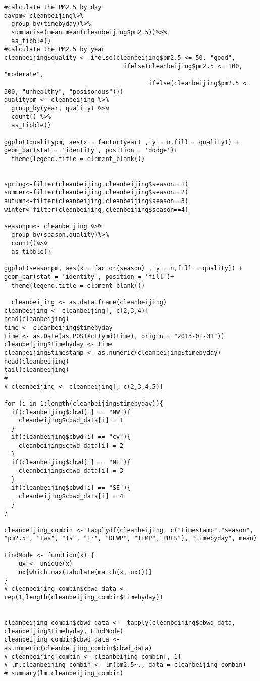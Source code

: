 \begin{verbatim}
#calculate the PM2.5 by day
daypm<-cleanbeijing%>%
  group_by(timebyday)%>%
  summarise(mean=mean(cleanbeijing$pm2.5))%>%
  as_tibble()
#calculate the PM2.5 by year
cleanbeijing$quality <- ifelse(cleanbeijing$pm2.5 <= 50, "good",
                                 ifelse(cleanbeijing$pm2.5 <= 100, "moderate",
                                        ifelse(cleanbeijing$pm2.5 <= 300, "unhealthy", "posisonous")))
qualitypm <- cleanbeijing %>%
  group_by(year, quality) %>%
  count() %>%
  as_tibble()

ggplot(qualitypm, aes(x = factor(year) , y = n,fill = quality)) + geom_bar(stat = 'identity', position = 'dodge')+
  theme(legend.title = element_blank())


spring<-filter(cleanbeijing,cleanbeijing$season==1)
summer<-filter(cleanbeijing,cleanbeijing$season==2)
autumn<-filter(cleanbeijing,cleanbeijing$season==3)
winter<-filter(cleanbeijing,cleanbeijing$season==4)

seasonpm<- cleanbeijing %>%
  group_by(season,quality)%>%
  count()%>%
  as_tibble()

ggplot(seasonpm, aes(x = factor(season) , y = n,fill = quality)) + geom_bar(stat = 'identity', position = 'fill')+
  theme(legend.title = element_blank())

  cleanbeijing <- as.data.frame(cleanbeijing)
cleanbeijing <- cleanbeijing[,-c(2,3,4)]
head(cleanbeijing)
time <- cleanbeijing$timebyday
time <- as.Date(as.POSIXct(ymd(time), origin = "2013-01-01"))
cleanbeijing$timebyday <- time
cleanbeijing$timestamp <- as.numeric(cleanbeijing$timebyday)
head(cleanbeijing)
tail(cleanbeijing)
#
# cleanbeijing <- cleanbeijing[,-c(2,3,4,5)]

for (i in 1:length(cleanbeijing$timebyday)){
  if(cleanbeijing$cbwd[i] == "NW"){
    cleanbeijing$cbwd_data[i] = 1
  }
  if(cleanbeijing$cbwd[i] == "cv"){
    cleanbeijing$cbwd_data[i] = 2
  }
  if(cleanbeijing$cbwd[i] == "NE"){
    cleanbeijing$cbwd_data[i] = 3
  }
  if(cleanbeijing$cbwd[i] == "SE"){
    cleanbeijing$cbwd_data[i] = 4
  }
}

cleanbeijing_combin <- tapplydf(cleanbeijing, c("timestamp","season", "pm2.5", "Iws", "Is", "Ir", "DEWP", "TEMP","PRES"), "timebyday", mean)

FindMode <- function(x) {
    ux <- unique(x)
    ux[which.max(tabulate(match(x, ux)))]
}
# cleanbeijing_combin$cbwd_data <- rep(1,length(cleanbeijing_combin$timebyday))


cleanbeijing_combin$cbwd_data <-  tapply(cleanbeijing$cbwd_data, cleanbeijing$timebyday, FindMode)
cleanbeijing_combin$cbwd_data <- as.numeric(cleanbeijing_combin$cbwd_data)
# cleanbeijing_combin <- cleanbeijing_combin[,-1]
# lm.cleanbeijing_combin <- lm(pm2.5~., data = cleanbeijing_combin)
# summary(lm.cleanbeijing_combin)


\end{verbatim}
